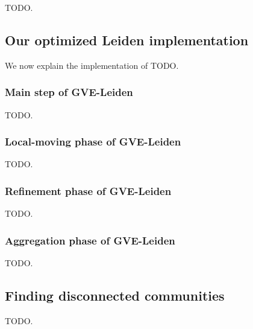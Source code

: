TODO.

% 
% 
% 




\subsection{Our optimized Leiden implementation}

We now explain the implementation of TODO.


\subsubsection{Main step of GVE-Leiden}

TODO.

% 
% 
% 
% 




\subsubsection{Local-moving phase of GVE-Leiden}

TODO.


\subsubsection{Refinement phase of GVE-Leiden}

TODO.


\subsubsection{Aggregation phase of GVE-Leiden}

TODO.




\subsection{Finding disconnected communities}

TODO.
